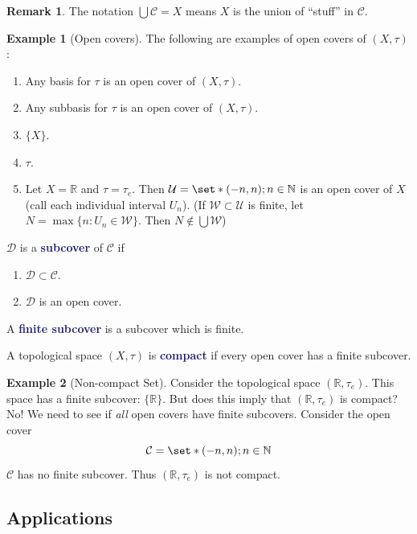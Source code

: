 \documentclass[11pt]{article}
\numberwithin{equation}{section}
\newcommand{\navy}[1]{\textcolor{MidnightBlue}{\bf #1}}
\newcounter{theo}[section]\setcounter{theo}{0}
\theoremstyle{definition}
\theoremstyle{definition}
\newtheorem{example}{\color{WildStrawberry}Example}[section]
\newtheorem*{remark}{Remark}
\def\Set{\set*}%
\def\ss{\subset}
\newcommand{\1}{\mathbbm 1}
\def\t{\tau}
\newcommand{\RR}{\mathbb R}
\newcommand{\NN}{\mathbb N}
\newcommand{\cC}{\mathcal C}
\newcommand{\dD}{\mathcal D}
\newcommand{\wW}{\mathcal W}
\newcommand{\uU}{\mathcal U}
\begin{document}
\begin{remark}
	The notation $\bigcup \cC = X$ means $X$ is the union of ``stuff'' in $\cC$. 
\end{remark}

\begin{example}[Open covers]
	The following are examples of open covers of $(X,\t)$:
	\begin{enumerate}
		\item Any basis for $\t$ is an open cover of $(X,\t)$. 
		\item Any subbasis for $\t$ is an open cover of $(X,\t)$.
		\item $\{X\}$.
		\item $\t$.
		\item Let $X = \RR$ and $\t = \t_e$. Then $\uU = \Set{(-n,n); n \in \NN}$ is an open cover of $X$ (call each individual interval $U_n$). (If $\wW \ss \uU$ is finite, let $N = \max\{n : U_n \in \wW\}$. Then $N \not \in \bigcup \wW$)
	\end{enumerate}
\end{example}

\begin{definition}[Subcover]
	$\dD$ is a \navy{subcover} of $\cC$ if
	\begin{enumerate}
		\item $\dD \ss \cC$.
		\item $\dD$ is an open cover.  
	\end{enumerate}
	A \navy{finite subcover} is a subcover which is finite.
\end{definition}


\begin{definition}[Compact]
	A topological space $(X,\t)$ is \navy{compact} if every open cover has a finite subcover. 
\end{definition}

\begin{example}[Non-compact Set]
	Consider the topological space $(\RR,\t_e)$. This space has a finite subcover: $\{\RR\}$. But does this imply that $(\RR,\t_e)$ is compact? No! We need to see if \emph{all} open covers have finite subcovers. Consider the open cover
	\begin{equation}
		\cC = \Set{(-n,n); n \in \NN}
	\end{equation} 
	$\cC$ has no finite subcover. Thus $(\RR,\t_e)$ is not compact. 
\end{example}

\subsection{Applications}
\end{document}
